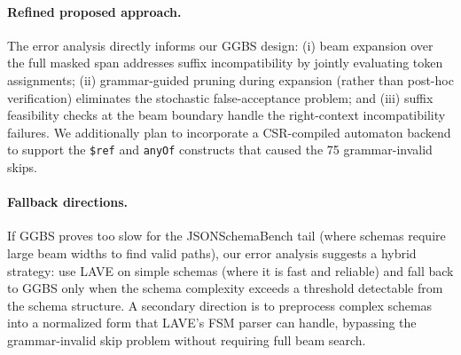 \paragraph{Refined proposed approach.}
The error analysis directly informs our GGBS design: (i) beam expansion over the full masked span addresses suffix incompatibility by jointly evaluating token assignments; (ii) grammar-guided pruning during expansion (rather than post-hoc verification) eliminates the stochastic false-acceptance problem; and (iii) suffix feasibility checks at the beam boundary handle the right-context incompatibility failures. We additionally plan to incorporate a CSR-compiled automaton backend to support the \texttt{\$ref} and \texttt{anyOf} constructs that caused the 75 grammar-invalid skips.

\paragraph{Fallback directions.}
If GGBS proves too slow for the JSONSchemaBench tail (where schemas require large beam widths to find valid paths), our error analysis suggests a hybrid strategy: use LAVE on simple schemas (where it is fast and reliable) and fall back to GGBS only when the schema complexity exceeds a threshold detectable from the schema structure. A secondary direction is to preprocess complex schemas into a normalized form that LAVE’s FSM parser can handle, bypassing the grammar-invalid skip problem without requiring full beam search.

